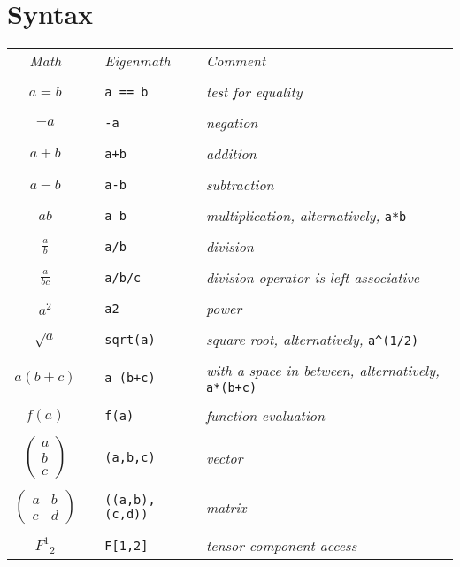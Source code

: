 
\section{Syntax}


\begin{center}
\begin{tabular}{clll}
{\it Math} & & {\it Eigenmath} & {\it Comment} \\
\\
$a=b$ & & \verb$a == b$ & {\it test for equality} \\
\\
$-a$ & & {\tt -a} & {\it negation} \\
\\
$a+b$ & & {\tt a+b} & {\it addition} \\
\\
$a-b$ & & {\tt a-b} & {\it subtraction} \\
\\
$ab$ & & {\tt a b} & {\it multiplication, alternatively,} \verb$a*b$ \\
\\
$\displaystyle\frac{a}{b}$ & & {\tt a/b} & {\it division}\\
\\
$\displaystyle\frac{a}{bc}$ & & {\tt a/b/c} & {\it division operator is left-associative} \\
\\
$a^2$ & & {\tt a{\char94}2} & {\it power}\\
\\
$\sqrt{a}$ & & \verb$sqrt(a)$ & {\it square root, alternatively,} \verb$a^(1/2)$ \\
\\
$a(b+c)$ & & {\tt a (b+c)} & {\it with a space in between, alternatively,} \verb$a*(b+c)$ \\
\\
$f(a)$ & & {\tt f(a)} & {\it function evaluation} \\
\\
$\begin{pmatrix}a\\ b\\ c\end{pmatrix}$ & & {\tt (a,b,c)} & {\it vector} \\
\\
$\begin{pmatrix}a&b\\ c&d\end{pmatrix}$ & & {\tt ((a,b),(c,d))} & {\it matrix} \\
\\
$F^1{}_2$ & & {\tt F[1,2]} & {\it tensor component access} \\
\end{tabular}
\end{center}
